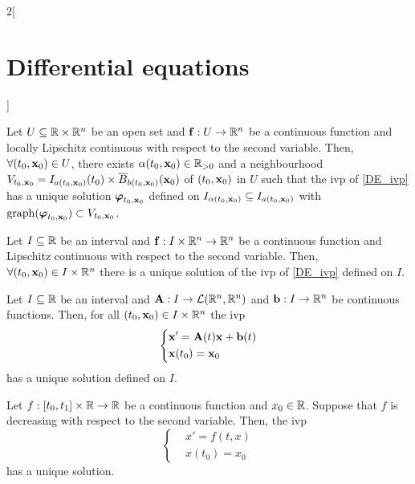 \documentclass[../../../main.tex]{subfiles}
\begin{document}
\begin{multicols}{2}[\section{Differential equations}]
\begin{corollary}
    Let $U\subseteq\mathbb{R}\times\mathbb{R}^n$ be an open set and $\boldsymbol{\mathrm{f}}:U\rightarrow\mathbb{R}^n$ be a continuous function and locally Lipschitz continuous with respect to the second variable. Then, $\forall(t_0,\boldsymbol{\mathrm{x}}_0)\in U$, there exists $\alpha(t_0,\boldsymbol{\mathrm{x}}_0)\in\mathbb{R}_{>0}$ and a neighbourhood $V_{t_0,\boldsymbol{\mathrm{x}}_0}=I_{a(t_0,\boldsymbol{\mathrm{x}}_0)}(t_0)\times\overline{B}_{b(t_0,\boldsymbol{\mathrm{x}}_0)}(\boldsymbol{\mathrm{x}}_0)$ of $(t_0,\boldsymbol{\mathrm{x}}_0)$ in $U$ such that the ivp of \cref{DE_ivp} has a unique solution $\boldsymbol{\mathrm{\varphi}}_{t_0,\boldsymbol{\mathrm{x}}_0}$ defined on $I_{\alpha(t_0,\boldsymbol{\mathrm{x}}_0)}\subseteq I_{a(t_0,\boldsymbol{\mathrm{x}}_0)}$ with $\operatorname{graph}(\boldsymbol{\mathrm{\varphi}}_{t_0,\boldsymbol{\mathrm{x}}_0})\subset V_{t_0,\boldsymbol{\mathrm{x}}_0}$.
  \end{corollary}
  \begin{prop}
    Let $I\subseteq\mathbb{R}$ be an interval and $\boldsymbol{\mathrm{f}}:I\times\mathbb{R}^n\rightarrow\mathbb{R}^n$ be a continuous function and Lipschitz continuous with respect to the second variable. Then, $\forall(t_0,\boldsymbol{\mathrm{x}}_0)\in I\times\mathbb{R}^n$ there is a unique solution of the ivp of \cref{DE_ivp} defined on $I$.
  \end{prop}
  \begin{corollary}
    Let $I\subseteq\mathbb{R}$ be an interval and $\boldsymbol{\mathrm{A}}:I\rightarrow\mathcal{L}(\mathbb{R}^n,\mathbb{R}^n)$ and $\boldsymbol{\mathrm{b}}:I\rightarrow\mathbb{R}^n$ be continuous functions. Then, for all $(t_0,\boldsymbol{\mathrm{x}}_0)\in I\times\mathbb{R}^n$ the ivp
    $$
      \left\{
      \begin{aligned}
         & \boldsymbol{\mathrm{x}}'=\boldsymbol{\mathrm{A}}(t)\boldsymbol{\mathrm{x}}+\boldsymbol{\mathrm{b}}(t) \\
         & \boldsymbol{\mathrm{x}}(t_0)=\boldsymbol{\mathrm{x}}_0
      \end{aligned}
      \right.
    $$
    has a unique solution defined on $I$.
  \end{corollary}
  \begin{theorem}
    Let $f:[t_0,t_1]\times\mathbb{R}\rightarrow\mathbb{R}$ be a continuous function and $x_0\in \mathbb{R}$. Suppose that $f$ is decreasing with respect to the second variable. Then, the ivp
    \begin{equation*}
      \left\{
      \begin{aligned}
         & x'=f(t,x)  \\
         & x(t_0)=x_0
      \end{aligned}
      \right.
    \end{equation*}
    has a unique solution.
  \end{theorem}

\end{multicols}
\end{document}
